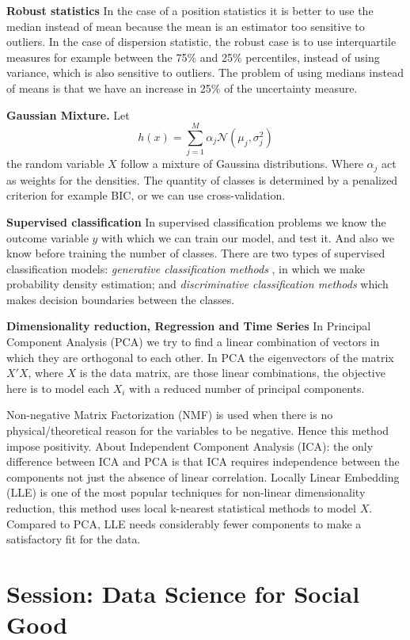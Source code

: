 \documentclass[9pt,a4paper]{article}
\begin{document}
\textbf{Robust statistics} In the case of a position statistics it is better to use the median instead of mean because the mean is an estimator too sensitive to outliers. In the case of dispersion statistic, the robust case is to use interquartile measures for example between the 75\% and 25\% percentiles, instead of using variance, which is also sensitive to outliers. The problem of using medians instead of means is that we have an increase in 25\% of the uncertainty measure.

\textbf{Gaussian Mixture.} Let 
$$ h(x) = \sum\limits_{j=1}^{M} \alpha_j \mathcal{N}(\mu_j,\sigma_j^2)  $$
the random variable $X$ follow a mixture of Gaussina distributions. Where $ \alpha_j $ act as weights for the densities. The quantity of classes is determined by a penalized criterion for example BIC, or we can use cross-validation.

\textbf{Supervised classification} In supervised classification problems we know the outcome variable $y$ with which we can train our model, and test it. And also we know before training the number of classes. There are two types of supervised classification models: \textit{generative classification methods }, in which we make probability density estimation; and \textit{discriminative classification methods } which makes decision boundaries between the classes.

\textbf{Dimensionality reduction, Regression and Time Series} In Principal Component Analysis (PCA) we try to find a linear combination of vectors in which they are orthogonal to each other. In PCA the eigenvectors of the matrix $X'X$, where $X$ is the data matrix, are those linear combinations, the objective here is to model each $X_i$ with a reduced number of principal components. 

Non-negative Matrix Factorization (NMF) is used when there is no physical/theoretical reason for the variables to be negative. Hence this method impose positivity. About Independent Component Analysis (ICA): the only difference between ICA and PCA is that ICA requires independence between the components not just the absence of linear correlation. Locally Linear Embedding (LLE) is one of the most popular techniques for non-linear dimensionality reduction, this method uses local k-nearest statistical methods to model $X$. Compared to PCA, LLE needs considerably fewer components to make a satisfactory fit for the data.

\section*{Session: Data Science for Social Good}
\end{document}
